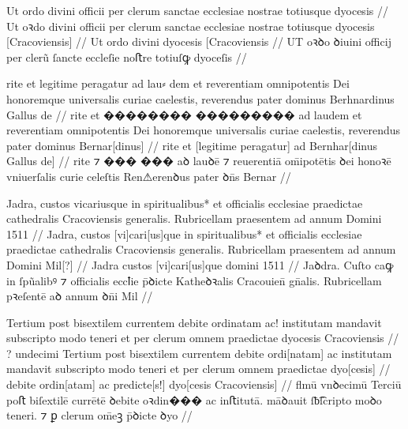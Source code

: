 


\ex \bg
\gla
{}
Ut ordo divini officii per clerum sanctae ecclesiae  nostrae totiusque 
dyocesis {}
//
\glRekonstrukcja
{}
Ut oꝛdo divini officii per clerum sanctae ecclesiae {} nostrae  totiusque 
dyocesis [Cracoviensis]
//
\glUbytki
{}
Ut ordo divini {} {} {} {} {} {} {} {} dyocesis [Cracoviensis
//
\glU
{}
UT oꝛꝺo ꝺiuini officij per clerũ ſancte eccleſie {} noﬅre  totiuſꝙ
dyoceſis {}
//
\endgl
\xe

\ex \bg
\gla
{}
rite et legitime peragatur ad {lau⸗  dem} et reverentiam 
omnipotentis Dei honoremque universalis curiae caelestis, reverendus 
pater dominus Berhnardinus Gallus de
//
\glRekonstrukcja
{}
rite et {��������} {���������} ad laudem et reverentiam 
omnipotentis Dei honoremque universalis curiae caelestis, reverendus 
pater dominus Bernar[dinus] {} {}
//
\glUbytki
{}
rite et [legitime peragatur] ad {} {}
{} {} {} {} {} {} {} {} {} {}
Bernhar[dinus Gallus de] 
//
\glU
{}
rite ⁊ {���} {���} aꝺ lauꝺē ⁊ reuerentiā om̄ipotētis ꝺei honoꝛē vniuerſalis curie celeſtis Ren⚠erenꝺus pater ꝺn̄s Bernar
//
\endgl
\xe


\ex \bg
\gla
{}
Jadra, custos vicariusque  in spiritualibus* et officialis ecclesiae praedictae cathedralis Cracoviensis 
generalis.
Rubricellam  praesentem ad annum Domini 1511
//
\glRekonstrukcja
{}
Jadra, custos [vi]cari[us]que {} in spiritualibus* et officialis ecclesiae praedictae cathedralis Cracoviensis 
generalis.
Rubricellam  praesentem ad annum Domini Mil[?]
//
\glUbytki
{}
Jadra custos [vi]cari[us]que
{} {} {} {} {} {} {} {} {} {}
{} {} {} {}
domini  1511
//
\glU
{}
Jaꝺdra. Cuſto caꝙ
{} in ſpũalibꝰ ⁊ oﬀicialis eccꝉie p̄ꝺicte Katheꝺꝛalis Cracouien̄ gn̄alis. Rubricellam  pꝛeſentē aꝺ annum ꝺn̄i Mil
//
\endgl
\xe


\ex \bg
\gla
{}
{} {}  Tertium 
post bisextilem  currentem debite ordinatam ac! institutam mandavit 
subscripto modo teneri et per clerum omnem praedictae dyocesis Cracoviensis
{}
//
\glRekonstrukcja
{}
{?} undecimi  Tertium 
post bisextilem {} currentem debite ordi[natam] ac institutam mandavit 
subscripto modo teneri et per clerum omnem praedictae dyo[cesis]
{}
//
\glUbytki
{}
{} {} {} {} {} {} {}
debite ordin[atam] ac
{} {} {} {} {} {} {} {} {}
predicte[s!] dyo[cesis Cracoviensis]
//
\glU
{}
ﬂmū vnꝺecimū  Terciū poﬅ biſextilē {} currētē ꝺebite oꝛdin��� ac inﬅitutā. māꝺauit ſƀ͡ſcripto moꝺo teneri. ⁊ ꝑ  clerum om̄eꝫ p̄ꝺicte ꝺyo
{}
//
\endgl
\xe




